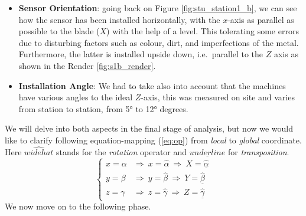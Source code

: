 \begin{itemize}
    \item \textbf{Sensor Orientation}: 
    going back on Figure \ref{fig:stu_station1_b}, we can see how the sensor has been installed horizontally, with the $x$-axis as parallel as possible to the blade ($X$) with 
    the help of a level. %
    This tolerating some errors due to disturbing factors such as colour, dirt, and imperfections of the metal.
    Furthermore, the latter is installed upside down, i.e.\ parallel to the $Z$ axis as shown in the Render \ref{fig:s1b_render}.
    \item \textbf{Installation Angle}:
    We had to take also into account that the machines have various angles to the ideal $Z$-axis, this was measured on site and varies from station to station, from 5° to 12° degrees.
\end{itemize}
We will delve into both aspects in the final stage of analysis, but now we would like to clarify following equation-mapping (\ref{eq:op}) from \textit{local} to \textit{global} coordinate.
Here $\widehat{widehat}$ stands for the \textit{rotation} operator and $\underline{underline}$ for \textit{transposition}. 
\begin{equation}
    \left\{ \begin{array}{cl}
        x = \alpha & \Rightarrow  \ x = \widehat{\alpha} \ \Rightarrow  \ X = \underline{\widehat{\alpha}} \\
        y = \beta & \Rightarrow  \ y = \widehat{\beta} \ \Rightarrow  \ Y = \underline{\widehat{\beta}} \\ 
        z = \gamma & \Rightarrow  \ z = \widehat{\gamma} \ \Rightarrow  \ Z = \underline{\widehat{\gamma}}
        \end{array} \right.
    \label{eq:op}
\end{equation}
We now move on to the following phase.


